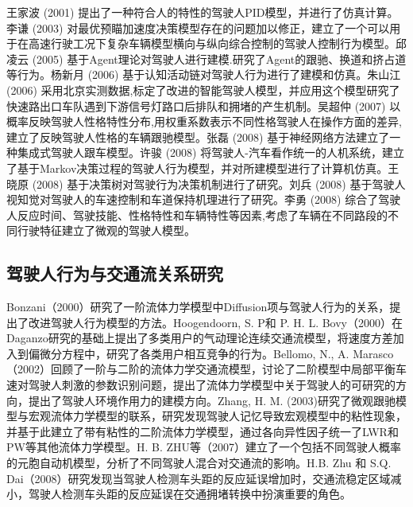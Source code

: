 王家波 (2001) 提出了一种符合人的特性的驾驶人PID模型，并进行了仿真计算\cite{王家波2001}。李谦 (2003) 对最优预瞄加速度决策模型存在的问题加以修正，建立了一个可以用于在高速行驶工况下复杂车辆模型横向与纵向综合控制的驾驶人控制行为模型\cite{李谦2003}。邱凌云 (2005) 基于Agent理论对驾驶人进行建模.研究了Agent的跟驰、换道和挤占道等行为\cite{邱凌云2005}。杨新月 (2006) 基于认知活动链对驾驶人行为进行了建模和仿真\cite{杨新月2006}。朱山江 (2006) 采用北京实测数据,标定了改进的智能驾驶人模型，并应用这个模型研究了快速路出口车队遇到下游信号灯路口后排队和拥堵的产生机制\cite{朱山江2006}。吴超仲 (2007) 以概率反映驾驶人性格特性分布,用权重系数表示不同性格驾驶人在操作方面的差异, 建立了反映驾驶人性格的车辆跟驰模型\cite{吴超仲2007}。张磊 (2008) 基于神经网络方法建立了一种集成式驾驶人跟车模型\cite{张磊2008}。许骏 (2008) 将驾驶人-汽车看作统一的人机系统，建立了基于Markov决策过程的驾驶人行为模型，并对所建模型进行了计算机仿真\cite{许骏2008}。王晓原 (2008) 基于决策树对驾驶行为决策机制进行了研究\cite{王晓原2008}。刘兵 (2008) 基于驾驶人视知觉对驾驶人的车速控制和车道保持机理进行了研究\cite{刘兵2008}。李勇 (2008) 综合了驾驶人反应时间、驾驶技能、性格特性和车辆特性等因素,考虑了车辆在不同路段的不同行驶特征建立了微观的驾驶人模型\cite{李勇2008}。


\subsection{驾驶人行为与交通流关系研究}

Bonzani（2000）研究了一阶流体力学模型中Diffusion项与驾驶人行为的关系，提出了改进驾驶人行为模型的方法\cite{Bonzani2000}。Hoogendoorn, S. P和 P. H. L. Bovy（2000）在Daganzo研究的基础上提出了多类用户的气动理论连续交通流模型，将速度方差加入到偏微分方程中，研究了各类用户相互竞争的行为\cite{Hoogendoorn2000}。Bellomo, N., A. Marasco（2002）回顾了一阶与二阶的流体力学交通流模型，讨论了二阶模型中局部平衡车速对驾驶人刺激的参数识别问题，提出了流体力学模型中关于驾驶人的可研究的方向，提出了驾驶人环境作用力的建模方向\cite{Bellomo2002}。Zhang, H. M. (2003)研究了微观跟驰模型与宏观流体力学模型的联系，研究发现驾驶人记忆导致宏观模型中的粘性现象，并基于此建立了带有粘性的二阶流体力学模型，通过各向异性因子统一了LWR和PW等其他流体力学模型\cite{Zhang2003a}。H. B. ZHU等（2007）建立了一个包括不同驾驶人概率的元胞自动机模型，分析了不同驾驶人混合对交通流的影响\cite{H.B.ZHU2007}。H.B. Zhu 和 S.Q. Dai（2008）研究发现当驾驶人检测车头距的反应延误增加时，交通流稳定区域减小，驾驶人检测车头距的反应延误在交通拥堵转换中扮演重要的角色\cite{Zhu2008}。

